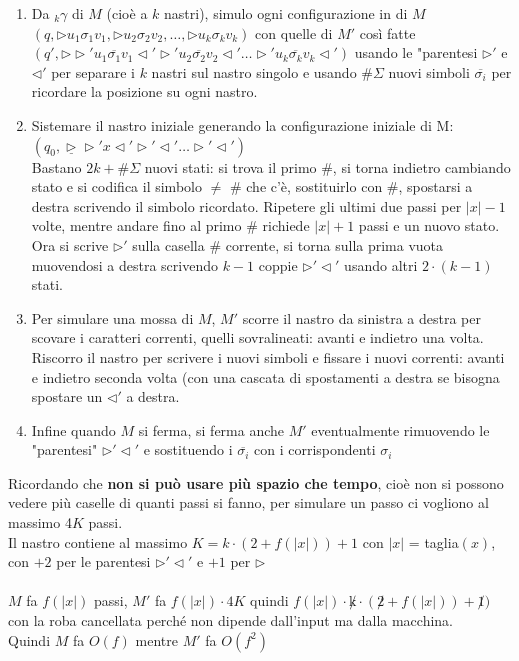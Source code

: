 \documentclass[10pt]{book}
\begin{document}
\begin{enumerate}
	\item Da $_k\gamma$ di $M$ (cioè a $k$ nastri), simulo ogni configurazione in di $M$\\$(q, \triangleright u_1 \sigma_1 v_1, \triangleright u_2 \sigma_2 v_2, \ldots, \triangleright u_k \sigma_k v_k)$ con quelle di $M'$ così fatte $(q', \triangleright \triangleright' u_1 \overline{\sigma_1} v_1 \triangleleft' \triangleright' u_2 \overline{\sigma_2} v_2 \triangleleft'\ldots \triangleright' u_k \overline{\sigma_k} v_k \triangleleft')$ usando le "parentesi $\triangleright'$ e $\triangleleft'$ per separare i $k$ nastri sul nastro singolo e usando \#$\Sigma$ nuovi simboli $\overline{\sigma_i}$ per ricordare la posizione su ogni nastro.
	\item Sistemare il nastro iniziale generando la configurazione iniziale di M: $(q_0,\underline{\triangleright} \triangleright' x \triangleleft' \triangleright' \triangleleft' \ldots \triangleright' \triangleleft' )$\\Bastano $2k + \#\Sigma$ nuovi stati: si trova il primo \#, si torna indietro cambiando stato e si codifica il simbolo $\neq$ \# che c'è, sostituirlo con \#, spostarsi a destra scrivendo il simbolo ricordato. Ripetere gli ultimi due passi per $|x| - 1$ volte, mentre andare fino al primo \# richiede $|x| + 1$ passi e un nuovo stato. Ora si scrive $\triangleright'$ sulla casella \# corrente, si torna sulla prima vuota muovendosi a destra scrivendo $k-1$ coppie $\triangleright'\triangleleft'$ usando altri $2\cdot(k-1)$ stati.
	\item Per simulare una mossa di $M$, $M'$ scorre il nastro da sinistra a destra per scovare i caratteri correnti, quelli sovralineati: avanti e indietro una volta.\\
	Riscorro il nastro per scrivere i nuovi simboli e fissare i nuovi correnti: avanti e indietro seconda volta (con una cascata di spostamenti a destra se bisogna spostare un $\triangleleft'$ a destra.
	\item Infine quando $M$ si ferma, si ferma anche $M'$ eventualmente rimuovendo le "parentesi" $\triangleright' \triangleleft'$ e sostituendo i $\overline{\sigma_i}$ con i corrispondenti $\sigma_i$
\end{enumerate}
Ricordando che \textbf{non si può usare più spazio che tempo}, cioè non si possono vedere più caselle di quanti passi si fanno, per simulare un passo ci vogliono al massimo 4$K$ passi.\\
Il nastro contiene al massimo $K = k\cdot (2 + f(|x|)) + 1$ con $|x|$ = taglia$(x)$, con $+2$ per le parentesi $\triangleright' \triangleleft'$ e $+1$ per $\triangleright$\\\\
$M$ fa $f(|x|)$ passi, $M'$ fa $f(|x|) \cdot 4K$ quindi $f(|x|) \cdot \not k \cdot (\not 2 + f(|x|)) + \not 1)$ con la roba cancellata perché non dipende dall'input ma dalla macchina.\\
Quindi $M$ fa $O(f)$ mentre $M'$ fa $O(f^2)$
\end{document}
